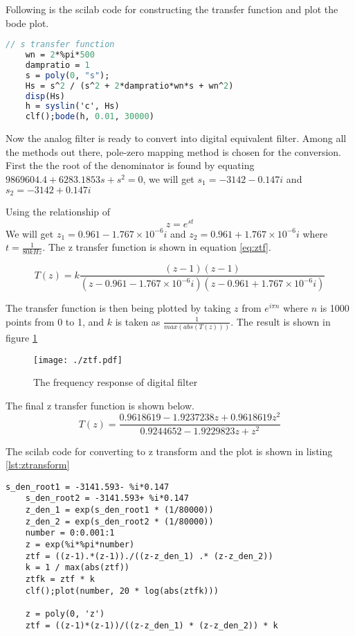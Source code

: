 \documentclass{article}
\begin{document}
Following is the scilab code for constructing the transfer function and plot the bode plot.
\begin{lstlisting}[language=Scilab]
    // s transfer function
    wn = 2*%pi*500
    dampratio = 1
    s = poly(0, "s");
    Hs = s^2 / (s^2 + 2*dampratio*wn*s + wn^2)
    disp(Hs)
    h = syslin('c', Hs)
    clf();bode(h, 0.01, 30000)
\end{lstlisting}

Now the analog filter is ready to convert into digital equivalent filter. Among all the methods out there, pole-zero mapping method is chosen for the conversion.
First the the root of the denominator is found by equating $9869604.4 + 6283.1853s + s^2 = 0$, we will get $s_1 = -3142-0.147i$ and $s_2 = -3142+0.147i$

Using the relationship of
\begin{equation}
    z = e^{st}
\end{equation}
We will get $z_1 = 0.961-1.767 \times 10 ^{-6}i$ and $z_2 = 0.961+1.767 \times 10 ^{-6}i$ where $t = \frac{1}{80kHz}$. The z transfer function is shown in equation \ref{eq:ztf}. 

\begin{equation}
    \label{eq:ztf}
    T(z) = k\frac{(z-1)(z-1)}{(z-0.961-1.767 \times 10 ^{-6}i)(z-0.961+1.767 \times 10 ^{-6}i)}
\end{equation}

The transfer function is then being plotted by taking $z$ from $e^{i\pi n}$ where $n$ is 1000 points from 0 to 1, and $k$ is taken as $\frac{1}{max(abs(T(z)))}$. The result is shown in figure \ref{fig:ztf}

\begin{figure}[htpb]
    \centering
    \texttt{[image: ./ztf.pdf]}
    \caption{The frequency response of digital filter}
    \label{fig:ztf}
\end{figure}

The final z transfer function is shown below.
\begin{equation}
    \label{eq:ztf_final}
    T(z) = \frac{0.9618619 - 1.9237238z + 0.9618619z^2}{0.9244652 - 1.9229823z + z^2}
\end{equation}

The scilab code for converting to z transform and the plot is shown in listing \ref{lst:ztransform}

\begin{lstlisting}[linewidth=12cm, caption={The scilab code for z transform}, label={lst:ztransform}]
    s_den_root1 = -3141.593- %i*0.147
    s_den_root2 = -3141.593+ %i*0.147
    z_den_1 = exp(s_den_root1 * (1/80000))
    z_den_2 = exp(s_den_root2 * (1/80000))
    number = 0:0.001:1
    z = exp(%i*%pi*number)
    ztf = ((z-1).*(z-1))./((z-z_den_1) .* (z-z_den_2))
    k = 1 / max(abs(ztf))
    ztfk = ztf * k
    clf();plot(number, 20 * log(abs(ztfk)))

    z = poly(0, 'z')
    ztf = ((z-1)*(z-1))/((z-z_den_1) * (z-z_den_2)) * k
\end{lstlisting}
\end{document}

